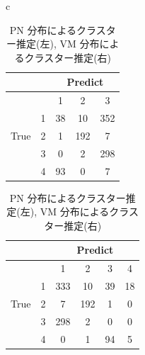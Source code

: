 \documentclass[a4j,11pt]{jarticle}
\begin{document}
\begin{table}[H]
\caption{PN 分布によるクラスター推定(左), VM 分布によるクラスター推定(右)}
\begin{tabular}{c}
\hspace{1.5cm}
\begin{minipage}{0.5\hsize}
\begin{center}
\begin{tabular}{|c|c|c|c|c|}
\hline
 &  & \multicolumn{3}{|c|}{Predict} \\ \hline
 &  & 1 & 2 & 3 \\ \hline 
 &1 & 38 & 10 & 352 \\ \cline{2-5}
True
 & 2 & 1 & 192 & 7 \\ \cline{2-5}
 & 3 & 0 & 2  & 298 \\ \cline{2-5}
 & 4 & 93 & 0 & 7 \\ 
\hline
 \end{tabular}
 \end{center}
\end{minipage}

\hspace{-2.5cm}
\begin{minipage}{0.5\hsize}
\begin{center}
\begin{tabular}{|c|c|c|c|c|c|}
\hline
 &  & \multicolumn{4}{|c|}{Predict} \\ \hline
 &  & 1 & 2 & 3 & 4 \\ \hline 
 & 1 & 333 & 10 & 39 & 18 \\ \cline{2-6}
True
 & 2 & 7 & 192 & 1 & 0 \\ \cline{2-6}
 & 3 & 298 & 2  & 0 & 0 \\ \cline{2-6}
 & 4 & 0 & 1 & 94 & 5 \\ 
\hline
\end{tabular}
\end{center}
\end{minipage}

\end{tabular}
\end{table}
\fi
\end{document}
